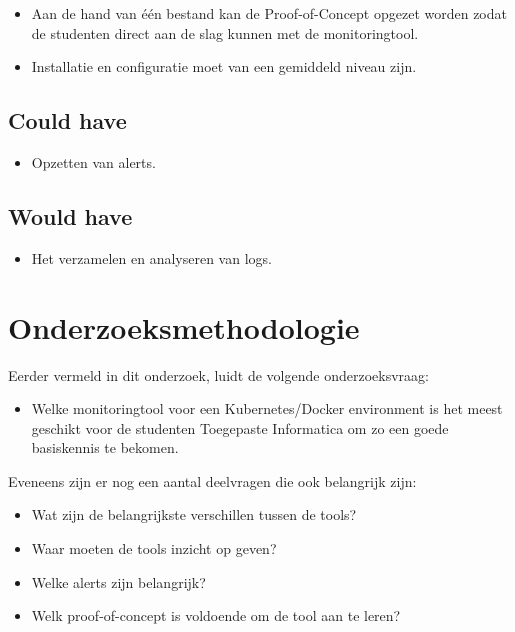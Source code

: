 \begin{itemize}
    \item Aan de hand van één bestand kan de Proof-of-Concept opgezet worden zodat de studenten direct aan de slag kunnen met de monitoringtool.
    \item Installatie en configuratie moet van een gemiddeld niveau zijn.
\end{itemize}

\subsection{Could have}

\begin{itemize}
    \item Opzetten van alerts.
\end{itemize}

\subsection{Would have}

\begin{itemize}
    \item Het verzamelen en analyseren van logs. 
\end{itemize}
\clearpage
\section{Onderzoeksmethodologie}

Eerder vermeld in dit onderzoek, luidt de volgende onderzoeksvraag:

\begin{itemize}
    \item Welke monitoringtool voor een Kubernetes/Docker environment is het meest geschikt voor de studenten Toegepaste Informatica om zo een goede basiskennis te bekomen.
\end{itemize}

Eveneens zijn er nog een aantal deelvragen die ook belangrijk zijn:

\begin{itemize}
    \item Wat zijn de belangrijkste verschillen tussen de tools?
    \item Waar moeten de tools inzicht op geven?
    \item Welke alerts zijn belangrijk?
    \item Welk proof-of-concept is voldoende om de tool aan te leren?
\end{itemize}

